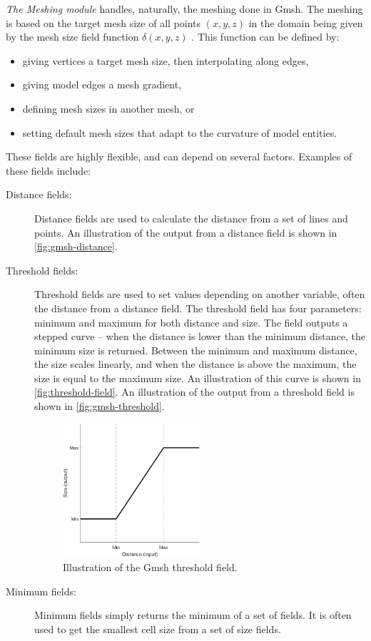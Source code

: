 \emph{The Meshing module} handles, naturally, the meshing done in Gmsh. The meshing is based on the target mesh size of all points $(x, y, z)$ in the domain being given by the mesh size field function $\delta(x, y, z)$ \cite{Gmsh_article}. This function can be defined by:
\begin{itemize}
    \item giving vertices a target mesh size, then interpolating along edges,
    \item giving model edges a mesh gradient,
    \item defining mesh sizes in another mesh, or
    \item setting default mesh sizes that adapt to the curvature of model entities.
\end{itemize}
These fields are highly flexible, and can depend on several factors. Examples of these fields include:
\begin{description}
    \item[Distance fields:] Distance fields are used to calculate the distance from a set of lines and points. An illustration of the output from a distance field is shown in \autoref{fig:gmsh-distance}.
    \item[Threshold fields:] Threshold fields are used to set values depending on another variable, often the distance from a distance field. The threshold field has four parameters: minimum and maximum for both distance and size. The field outputs a stepped curve -- when the distance is lower than the minimum distance, the minimum size is returned. Between the minimum and maximum distance, the size scales linearly, and when the distance is above the maximum, the size is equal to the maximum size. An illustration of this curve is shown in \autoref{fig:threshold-field}. An illustration of the output from a threshold field is shown in \autoref{fig:gmsh-threshold}.
    
    \begin{figure}[ht]
        \centering
        \includegraphics[width=0.5\textwidth]{report/Images/Software/thresholdCurve.png}
        \caption{Illustration of the Gmsh threshold field.}
        \label{fig:threshold-field}
    \end{figure}
    
    \item[Minimum fields:] Minimum fields simply returns the minimum of a set of fields. It is often used to get the smallest cell size from a set of size fields.
\end{description}

